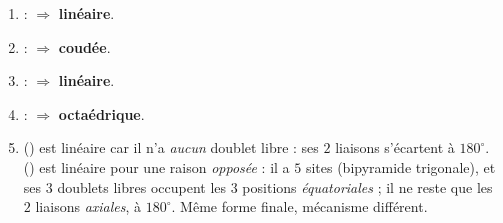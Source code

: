 \documentclass[11pt,a4paper]{article}
\begin{document}
\begin{corrige}
\begin{enumerate}[label=\alph*)]
  \item {} :  $\Rightarrow$ \textbf{linéaire}.
  \item {} :  $\Rightarrow$ \textbf{coudée}.
  \item {} :  $\Rightarrow$ \textbf{linéaire}.
  \item {} :  $\Rightarrow$ \textbf{octaédrique}.
  \item {} () est linéaire car il n'a \emph{aucun} doublet libre : ses $2$
        liaisons s'écartent à $180^\circ$.  () est linéaire pour une raison
        \emph{opposée} : il a $5$ sites (bipyramide trigonale), et ses $3$ doublets libres occupent
        les $3$ positions \emph{équatoriales} ; il ne reste que les $2$ liaisons \emph{axiales}, à
        $180^\circ$. Même forme finale, mécanisme différent.
\end{enumerate}
\end{corrige}
\end{document}
